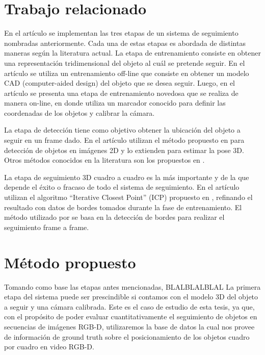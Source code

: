 \section{Trabajo relacionado}

En el artículo \cite{park2011texture} se implementan las tres etapas de un sistema de seguimiento nombradas anteriormente. Cada una de estas etapas es abordada de distintas maneras según la literatura actual.
La etapa de entrenamiento consiste en obtener una representación tridimensional del objeto al cuál se pretende seguir. En el artículo \cite{drummond1999real} se utiliza un entrenamiento off-line que consiste en obtener un modelo CAD (computer-aided design) del objeto que se desea seguir. Luego, en el artículo \cite{park2011texture} se presenta una etapa de entrenamiento novedosa que se realiza de manera on-line, en donde utiliza un marcador conocido para definir las coordenadas de los objetos y calibrar la cámara.

La etapa de detección tiene como objetivo obtener la ubicación del objeto a seguir en un frame dado. En el artículo \cite{park2011texture} utilizan el método propuesto en \cite{hinterstoisser2010dominant} para detección de objetos en imágenes 2D y lo extienden para estimar la pose 3D. Otros métodos conocidos en la literatura son los propuestos en \cite{brunelli2009template,korman13fast}. 

La etapa de seguimiento 3D cuadro a cuadro es la más importante y de la que depende el éxito o fracaso de todo el sistema de seguimiento. En el artículo \cite{park2011texture} utilizan el algoritmo ``Iterative Closest Point'' (ICP) propuesto en \cite{zhang94icp,besl92icp}, refinando el resultado con datos de bordes tomados durante la fase de entrenamiento. El método utilizado por \cite{drummond1999real} se basa en la detección de bordes para realizar el seguimiento frame a frame. 

\section{Método propuesto}
Tomando como base las etapas antes mencionadas, BLALBLALBLAL La primera etapa del sistema puede ser prescindible si contamos con el modelo 3D del objeto a seguir y una cámara calibrada. Este es el caso de estudio de esta tesis, ya que, con el propósito de poder evaluar cuantitativamente el seguimiento de objetos en secuencias de imágenes RGB-D, utilizaremos la base de datos \cite{lai2011large} la cual nos provee de información de ground truth sobre el posicionamiento de los objetos cuadro por cuadro en video RGB-D. 


